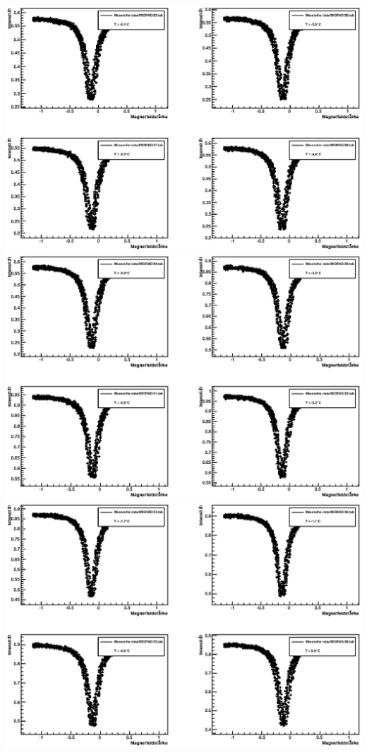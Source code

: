 \documentclass[12pt]{article}
\begin{document}
\includegraphics[width=1\linewidth]{pictures/3.eps} \\
\includegraphics[width=1\linewidth]{pictures/4.eps} \\
\includegraphics[width=1\linewidth]{pictures/5.eps} \\
\end{document}
